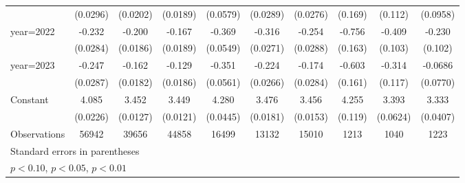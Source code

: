 \begin{table}[htbp]
\begin{tabular}{l*{9}{c}}
                    &    (0.0296)         &    (0.0202)         &    (0.0189)         &    (0.0579)         &    (0.0289)         &    (0.0276)         &     (0.169)         &     (0.112)         &    (0.0958)         \\
[1em]
year=2022           &      -0.232\sym{***}&      -0.200\sym{***}&      -0.167\sym{***}&      -0.369\sym{***}&      -0.316\sym{***}&      -0.254\sym{***}&      -0.756\sym{***}&      -0.409\sym{***}&      -0.230\sym{**} \\
                    &    (0.0284)         &    (0.0186)         &    (0.0189)         &    (0.0549)         &    (0.0271)         &    (0.0288)         &     (0.163)         &     (0.103)         &     (0.102)         \\
[1em]
year=2023           &      -0.247\sym{***}&      -0.162\sym{***}&      -0.129\sym{***}&      -0.351\sym{***}&      -0.224\sym{***}&      -0.174\sym{***}&      -0.603\sym{***}&      -0.314\sym{***}&     -0.0686         \\
                    &    (0.0287)         &    (0.0182)         &    (0.0186)         &    (0.0561)         &    (0.0266)         &    (0.0284)         &     (0.161)         &     (0.117)         &    (0.0770)         \\
[1em]
Constant            &       4.085\sym{***}&       3.452\sym{***}&       3.449\sym{***}&       4.280\sym{***}&       3.476\sym{***}&       3.456\sym{***}&       4.255\sym{***}&       3.393\sym{***}&       3.333\sym{***}\\
                    &    (0.0226)         &    (0.0127)         &    (0.0121)         &    (0.0445)         &    (0.0181)         &    (0.0153)         &     (0.119)         &    (0.0624)         &    (0.0407)         \\
\hline
Observations        &       56942         &       39656         &       44858         &       16499         &       13132         &       15010         &        1213         &        1040         &        1223         \\
\hline\hline
\multicolumn{10}{l}{\footnotesize Standard errors in parentheses}\\
\multicolumn{10}{l}{\footnotesize \sym{*} \(p<0.10\), \sym{**} \(p<0.05\), \sym{***} \(p<0.01\)}\\
\end{tabular}
\end{table}
